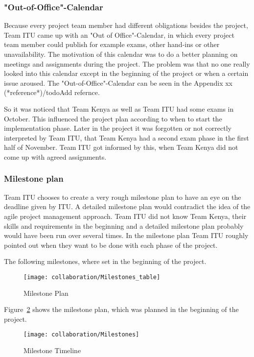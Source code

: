 \subsubsection{"Out-of-Office"-Calendar}

Because every project team member had different obligations besides the project, Team ITU came up with an "Out of Office"-Calendar, in which every project team member could publish for example exams, other hand-ins or other unavailability. The motivation of this calendar was to do a better planning on meetings and assignments during the project. The problem was that no one really looked into this calendar except in the beginning of the project or when a certain issue aroused. The "Out-of-Office"-Calendar can be seen in the Appendix xx (*reference*)/todo{Add refernce}.

So it was noticed that Team Kenya as well as Team ITU had some exams in October. This influenced the project plan according to when to start the implementation phase. Later in the project it was forgotten or not correctly interpreted by Team ITU, that Team Kenya had a second exam phase in the first half of November. Team ITU got informed by this, when Team Kenya did not come up with agreed assignments.


\subsubsection{Milestone plan}
Team ITU chooses to create a very rough milestone plan to have an eye on the deadline given by ITU. A detailed milestone plan would contradict the idea of the agile project management approach. Team ITU did not know Team Kenya, their skills and requirements in the beginning and a detailed milestone plan probably would have been run over several times. In the milestone plan Team ITU roughly pointed out when they want to be done with each phase of the project.

The following milestones, where set in the beginning of the project.

	\begin{figure}[ht]
		\centering
		\texttt{[image: collaboration/Milestones\_table]}
		\caption{Milestone Plan}
		\label{fig:milestones_table}
	\end{figure}

Figure~\ref{fig:milestones} shows the milestone plan, which was planned in the beginning of the project.

	\begin{figure}[ht]
		\centering
		\texttt{[image: collaboration/Milestones]}
		\caption{Milestone Timeline}
		\label{fig:milestones}
	\end{figure}

